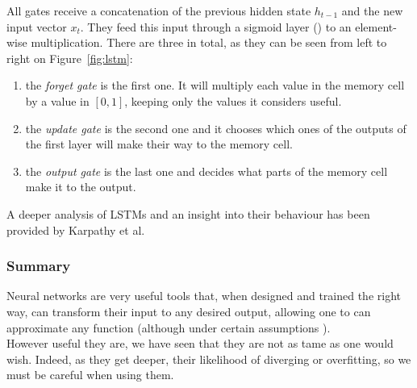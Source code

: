 All gates receive a concatenation of the previous hidden
state $h_{t-1}$ and the new input vector $x_t$. They feed this input through a
sigmoid layer () to an element-wise multiplication. There are 
three in total, as they can be seen from left to right on Figure~\ref{fig:lstm}:
\begin{enumerate}
	\item the \textit{forget gate} is the first one. It will multiply each
		value in the memory cell by a value in $[0, 1]$, keeping only
		the values it considers useful.
	\item the \textit{update gate} is the second one and it chooses which
		ones of the outputs of the first  layer will
		make their way to the memory cell.
	\item the \textit{output gate} is the last one and decides what parts
		of the memory cell make it to the output.
\end{enumerate}
A deeper analysis of LSTMs and an insight into their behaviour has been
provided by Karpathy et al. \cite{lstm-analysis}

\subsubsection{Summary}
Neural networks are very useful tools that, when designed and trained the right way,
can transform their input to any desired output, allowing one to 
can approximate any function (although under certain assumptions
\cite{approx_theorem}).\\

However useful they are, we have seen that they are not as tame as one would
wish. Indeed, as they get deeper, their likelihood of diverging or
overfitting, so we must be careful when using them.
